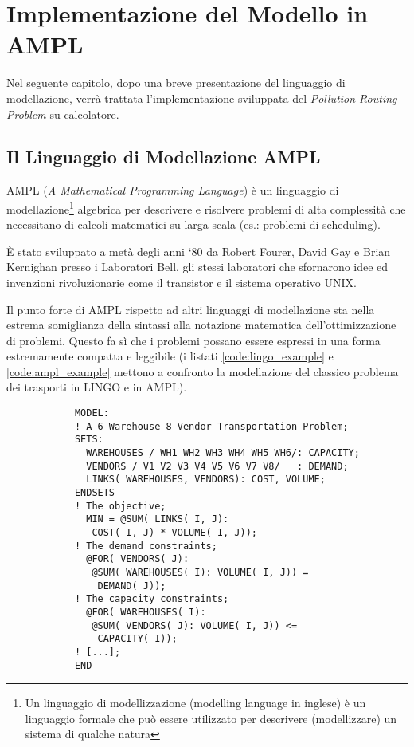 \chapter{Implementazione del Modello in AMPL}\label{ch:ampl}
	Nel seguente capitolo, dopo una breve presentazione del linguaggio di modellazione, verrà trattata l’implementazione sviluppata del \emph{Pollution Routing Problem} su calcolatore.

	\section{Il Linguaggio di Modellazione AMPL} %
	\label{sec:il_linguaggio_di_modellazione_ampl}
		AMPL (\emph{A Mathematical Programming Language}) è un linguaggio di modellazione\footnote{Un linguaggio di modellizzazione (modelling language in inglese) è un linguaggio formale che può essere utilizzato per descrivere (modellizzare) un sistema di qualche natura} algebrica	per descrivere e risolvere problemi di alta complessità che necessitano di calcoli matematici su larga scala (es.: problemi di  scheduling). 
		
		È stato sviluppato a metà degli anni ‘80 da Robert Fourer, David Gay e Brian Kernighan presso i Laboratori Bell, gli stessi laboratori che sfornarono idee ed invenzioni rivoluzionarie come il transistor e il sistema operativo UNIX.

		Il punto forte di AMPL rispetto ad altri linguaggi di modellazione sta nella estrema somiglianza della sintassi alla notazione matematica dell’ottimizzazione di problemi. 
		Questo fa sì che i problemi possano essere espressi in una forma estremamente compatta e leggibile (i listati \ref{code:lingo_example} e \ref{code:ampl_example} mettono a confronto la modellazione del classico problema dei trasporti in LINGO e in AMPL).

		\begin{verbatim}
			MODEL:
			! A 6 Warehouse 8 Vendor Transportation Problem;
			SETS:
			  WAREHOUSES / WH1 WH2 WH3 WH4 WH5 WH6/: CAPACITY;
			  VENDORS / V1 V2 V3 V4 V5 V6 V7 V8/   : DEMAND;
			  LINKS( WAREHOUSES, VENDORS): COST, VOLUME;
			ENDSETS
			! The objective;
			  MIN = @SUM( LINKS( I, J):
			   COST( I, J) * VOLUME( I, J));
			! The demand constraints;
			  @FOR( VENDORS( J):
			   @SUM( WAREHOUSES( I): VOLUME( I, J)) =
			    DEMAND( J));
			! The capacity constraints;
			  @FOR( WAREHOUSES( I):
			   @SUM( VENDORS( J): VOLUME( I, J)) <=
			    CAPACITY( I));
			! [...];
			END
		\end{verbatim}

